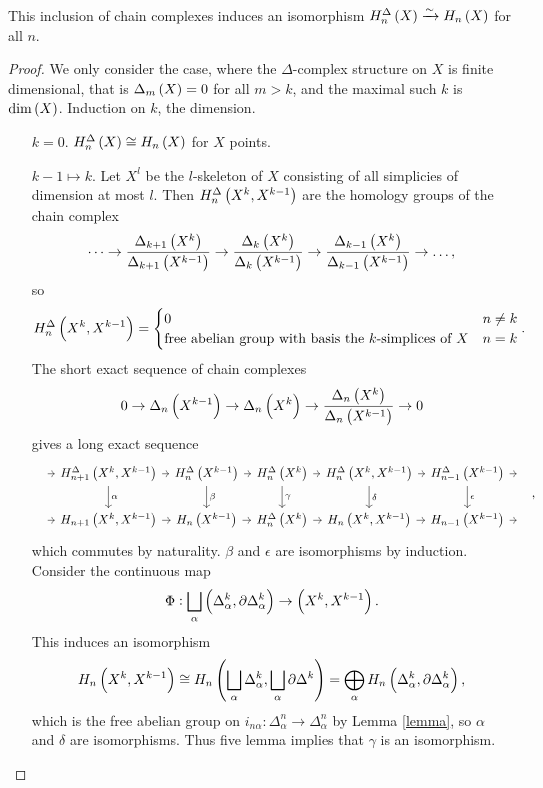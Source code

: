\begin{theorem}
This inclusion of chain complexes induces an isomorphism $ H_n^\Delta\br{X} \xrightarrow{\sim} H_n\br{X} $ for all $ n $.
\end{theorem}

\begin{proof}
We only consider the case, where the $ \Delta $-complex structure on $ X $ is finite dimensional, that is $ \Delta_m\br{X} = 0 $ for all $ m > k $, and the maximal such $ k $ is $ \dim\br{X} $. Induction on $ k $, the dimension.
\begin{itemize}[leftmargin=2cm]
\item[$ k = 0 $.] $ H_n^\Delta\br{X} \cong H_n\br{X} $ for $ X $ points.
\item[$ k - 1 \mapsto k $.] Let $ X^l $ be the $ l $-skeleton of $ X $ consisting of all simplicies of dimension at most $ l $. Then $ H_n^\Delta\br{X^k, X^{k - 1}} $ are the homology groups of the chain complex
$$ \dots \to \dfrac{\Delta_{k + 1}\br{X^k}}{\Delta_{k + 1}\br{X^{k - 1}}} \to \dfrac{\Delta_k\br{X^k}}{\Delta_k\br{X^{k - 1}}} \to \dfrac{\Delta_{k - 1}\br{X^k}}{\Delta_{k - 1}\br{X^{k - 1}}} \to \dots, $$
so
$$ H_n^\Delta\br{X^k, X^{k - 1}} =
\begin{cases}
0 & n \ne k \\
\text{free abelian group with basis the $ k $-simplices of} \ X & n = k
\end{cases}.
$$
The short exact sequence of chain complexes
$$ 0 \to \Delta_n\br{X^{k - 1}} \to \Delta_n\br{X^k} \to \dfrac{\Delta_n\br{X^k}}{\Delta_n\br{X^{k - 1}}} \to 0 $$
gives a long exact sequence
$$
\begin{tikzcd}[column sep=tiny]
\ \arrow{r} & H_{n + 1}^\Delta\br{X^k, X^{k - 1}} \arrow{r} \arrow{d}{\alpha} & H_n^\Delta\br{X^{k - 1}} \arrow{r} \arrow{d}{\beta} & H_n^\Delta\br{X^k} \arrow{r} \arrow{d}{\gamma} & H_n^\Delta\br{X^k, X^{k - 1}} \arrow{r} \arrow{d}{\delta} & H_{n - 1}^\Delta\br{X^{k - 1}} \arrow{d}{\epsilon} \arrow{r} & \ \\
\ \arrow{r} & H_{n + 1}\br{X^k, X^{k - 1}} \arrow{r} & H_n\br{X^{k - 1}} \arrow{r} & H_n^\Delta\br{X^k} \arrow{r} & H_n\br{X^k, X^{k - 1}} \arrow{r} & H_{n - 1}\br{X^{k - 1}} \arrow{r} & \
\end{tikzcd},
$$
which commutes by naturality. $ \beta $ and $ \epsilon $ are isomorphisms by induction. Consider the continuous map
$$ \Phi : \bigsqcup_\alpha \br{\Delta_\alpha^k, \partial\Delta_\alpha^k} \to \br{X^k, X^{k - 1}}. $$
This induces an isomorphism
$$ H_n\br{X^k, X^{k - 1}} \cong H_n\br{\bigsqcup_\alpha \Delta_\alpha^k, \bigsqcup_\alpha \partial\Delta^k} = \bigoplus_\alpha H_n\br{\Delta_\alpha^k, \partial\Delta_\alpha^k}, $$
which is the free abelian group on $ i_{n\alpha} : \Delta_\alpha^n \to \Delta_\alpha^n $ by Lemma \ref{lemma}, so $ \alpha $ and $ \delta $ are isomorphisms. Thus five lemma implies that $ \gamma $ is an isomorphism.
\end{itemize}
\end{proof}

